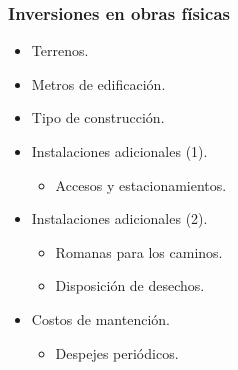 \documentclass{templateNote}
\begin{document}
\subsubsection*{Inversiones en obras físicas}
\vspace{0.5cm}
\begin{minipage}[H]{0.45\textwidth}
    \begin{itemize}
        \item Terrenos.
        \item Metros de edificación.
        \item Tipo de construcción.
        \item Instalaciones adicionales (1).
        \begin{itemize}
            \item Accesos y estacionamientos.
        \end{itemize}
    \end{itemize}
\end{minipage}
\hfill
\begin{minipage}[H]{0.45\textwidth}
    \begin{itemize}
        \item Instalaciones adicionales (2).
        \begin{itemize}
            \item Romanas para los caminos.
            \item Disposición de desechos.
        \end{itemize}
        \item Costos de mantención.
        \begin{itemize}
            \item Despejes periódicos.
        \end{itemize}
    \end{itemize}
\end{minipage}
\end{document}
